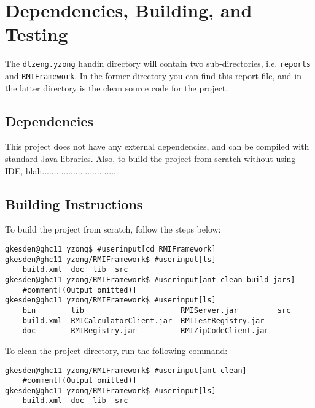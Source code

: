 \documentclass{article} %
\begin{document}
\section{Dependencies, Building, and Testing}

\par\qquad The \texttt{dtzeng.yzong} handin directory will contain two sub-directories, i.e. \texttt{reports} and \texttt{RMIFramework}. In the former directory you can find this report file, and in the latter directory is the clean source code for the project.

\subsection{Dependencies}

\par\qquad This project does not have any external dependencies, and can be compiled with standard Java libraries. Also, to build the project from scratch without using IDE, blah...............................

\subsection{Building Instructions}

\par\qquad To build the project from scratch, follow the steps below:

\begin{Verbatim}[commandchars=\#\[\]]
gkesden@ghc11 yzong$ #userinput[cd RMIFramework]
gkesden@ghc11 yzong/RMIFramework$ #userinput[ls]
    build.xml  doc  lib  src
gkesden@ghc11 yzong/RMIFramework$ #userinput[ant clean build jars]
    #comment[(Output omitted)]
gkesden@ghc11 yzong/RMIFramework$ #userinput[ls]
    bin        lib                      RMIServer.jar         src
    build.xml  RMICalculatorClient.jar  RMITestRegistry.jar
    doc        RMIRegistry.jar          RMIZipCodeClient.jar

\end{Verbatim}

\par\qquad To clean the project directory, run the following command:
\begin{Verbatim}[commandchars=\#\[\]]
gkesden@ghc11 yzong/RMIFramework$ #userinput[ant clean]
    #comment[(Output omitted)]
gkesden@ghc11 yzong/RMIFramework$ #userinput[ls]
    build.xml  doc  lib  src
\end{Verbatim}
\end{document}
